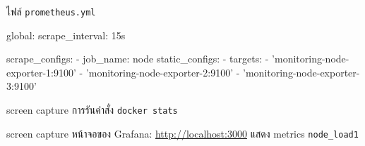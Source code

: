 \documentclass[a4paper, 10pt]{article}
\begin{document}
\begin{problem}
\textthai{ไฟล์} \texttt{prometheus.yml}
\end{problem}

\begin{solution}
	\begin{codingbox*}[language=yaml]
global:
  scrape_interval: 15s

scrape_configs:
  - job_name: node
    static_configs:
      - targets:
        - 'monitoring-node-exporter-1:9100'
        - 'monitoring-node-exporter-2:9100'
        - 'monitoring-node-exporter-3:9100'
\end{codingbox*}
\end{solution}

\begin{problem}
screen capture \textthai{การรันคำสั่ง} \texttt{docker stats}
\end{problem}

\begin{solution}
\end{solution}

\begin{problem}
screen capture \textthai{หน้าจอของ} Grafana: \href{http://localhost:3000}{http://localhost:3000}
\textthai{แสดง} metrics \texttt{node\_load1}
\end{problem}

\begin{solution}
\end{solution}
\end{document}
